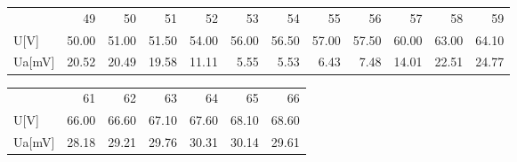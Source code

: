 \documentclass[a4paper,10pt]{article}
\begin{document}
\begin{figure}[H]
\begin{tabular}{lrrrrrrrrrrr}

{} &     49 &     50 &     51 &     52 &     53 &     54 &     55 &     56 &     57 &     58 &     59 \\

U[V]  &  50.00 &  51.00 &  51.50 &  54.00 &  56.00 &  56.50 &  57.00 &  57.50 &  60.00 &  63.00 &  64.10 \\
Ua[mV] &  20.52 &  20.49 &  19.58 &  11.11 &   5.55 &   5.53 &   6.43 &   7.48 &  14.01 &  22.51 &  24.77 \\

\end{tabular}
\end{figure}

\begin{figure}[H]
\begin{tabular}{lrrrrrr}

{} &     61 &     62 &     63 &     64 &     65 &     66 \\

U[V]  &  66.00 &  66.60 &  67.10 &  67.60 &  68.10 &  68.60 \\
Ua[mV] &  28.18 &  29.21 &  29.76 &  30.31 &  30.14 &  29.61 \\

\end{tabular}
\end{figure}
\end{document}
